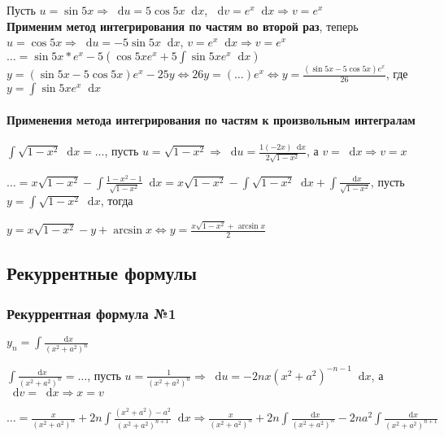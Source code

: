 \documentclass{article}
\newcommand*\diff{\mathop{}\!\mathrm{d}}
\begin{document}
\begin{enumerate}
    Пусть $u = \sin 5x \Longrightarrow \diff u = 5 \cos 5 x \diff x$, $\diff v = e^{x} \diff x \Longrightarrow v = e^{x}$ \\
    \textbf{Применим метод интегрирования по частям во второй раз}, теперь $u = \cos 5 x \Longrightarrow \diff u = - 5 \sin 5 x \diff x$, $v = e^{x} \diff x \Longrightarrow v = e^{x}$ \\
    $\dots = \sin 5 x * e^{x} - 5 (\cos 5 x e^{x} + 5 \int \sin 5 x e^{x} \diff x)$ \\
    $y = (\sin 5 x - 5 \cos 5 x) e^{x} - 25 y \Longleftrightarrow 26 y = (\dots) e^{x} \Longleftrightarrow y = \frac{(\sin 5x - 5 \cos 5 x) e^{x}}{26}$, где $y = \int \sin 5 x e^{x} \diff x$
\end{enumerate}

\paragraph{Применения метода интегрирования по частям к произвольным интегралам}

$\int \sqrt{1 - x^2} \diff x = \dots$, пусть $u = \sqrt{1 - x^2} \Longrightarrow \diff u = \frac{1(-2x) \diff x}{2\sqrt{1 - x^2}}$, а $v = \diff x \Longrightarrow v = x$

$\dots = x \sqrt{1 - x^2} - \int \frac{1 - x^2 - 1}{\sqrt{1 - x^2}} \diff x = x \sqrt{1 - x^2} - \int \sqrt{1 - x^2} \diff x + \int \frac{\diff x}{\sqrt{1 - x^2}}$, пусть $y = \int \sqrt{1 - x^2} \diff x$, тогда

$y = x \sqrt{1 - x^2} - y + \arcsin x \Longleftrightarrow y = \frac{x \sqrt{1 - x^2} + \arcsin x}{2}$

\subsection{Рекуррентные формулы}

\subsubsection{Рекуррентная формула №1}

$y_{n} = \int \frac{\diff x}{(x^2 + a^2)^{n}}$

\hfill

$\int \frac{\diff x}{(x^2 + a^2)^{n}} = \dots$, пусть $u = \frac{1}{(x^2 + a^2)^{n}} \Longrightarrow \diff u = - 2 n x (x^2 + a^2)^{-n - 1} \diff x$, а $\diff v = \diff x \Longrightarrow x = v$

$\dots = \frac{x}{(x^2 + a^2)^{n}} + 2 n \int \frac{(x^2 + a^{2}) - a^{2}}{(x^2 + a^2)^{n + 1}} \diff x \Longrightarrow \frac{x}{(x^2 + a^2)^{n}} + 2 n \int \frac{\diff x}{(x^2 + a^2)^{n}} - 2 n a^2 \int \frac{\diff x}{(x^2 + a^2)^{n + 1}}$
\end{document}

